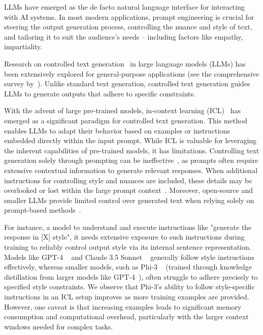 
LLMs have emerged as the de facto natural language interface for interacting with AI systems. In most modern applications, prompt engineering is crucial for steering the output generation process, controlling the nuance and style of text, and tailoring it to suit the audience's needs -- including factors like empathy, impartiality. %



Research on controlled text generation~\cite{mireshghallah2022mix} in large language models (LLMs) has been extensively explored for general-purpose applications (see the comprehensive survey by~\cite{ctg-survey}). Unlike standard text generation, controlled text generation guides LLMs to generate outputs that adhere to specific constraints.

With the advent of large pre-trained models, in-context learning (ICL)~\cite{brown2020language} has emerged as a significant paradigm for controlled text generation. This method enables LLMs to adapt their behavior based on examples or instructions embedded directly within the input prompt. While ICL is valuable for leveraging the inherent capabilities of pre-trained models, it has limitations. Controlling text generation solely through prompting can be ineffective~\cite{ye2022unreliability}, as prompts often require extensive contextual information to generate relevant responses. When additional instructions for controlling style and nuances are included, these details may be overlooked or lost within the large prompt context~\cite{liu2023lost}. Moreover, open-source and smaller LLMs provide limited control over generated text when relying solely on prompt-based methods~\cite{salinas2024butterfly}.

For instance, a model to understand and execute instructions like "generate the response in [X] style", it needs extensive exposure to such instructions during training to reliably control output style via its internal sentence representation. Models like GPT-4 ~\cite{achiam2023gpt} and Claude 3.5 Sonnet ~\cite{anthropic2023introducing}  generally follow style instructions effectively, whereas smaller models, such as Phi-3 ~\cite{abdin2024phi} (trained through knowledge distillation from larger models like GPT-4~\cite{achiam2023gpt}), often struggle to adhere precisely to specified style constraints. We observe that Phi-3's ability to follow style-specific instructions in an ICL setup improves as more training examples are provided. However, one caveat is that increasing examples leads to significant memory consumption and computational overhead, particularly with the larger context windows needed for complex tasks.

